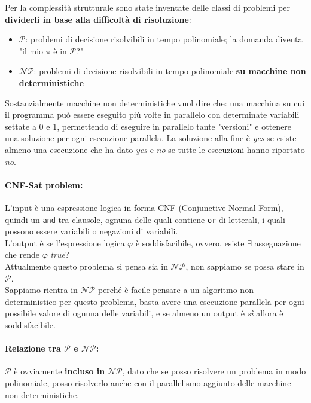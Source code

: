 Per la complessità strutturale sono state inventate delle classi di problemi per \textbf{dividerli in base alla difficoltà di risoluzione}: 
\begin{itemize}
	\item $\mathcal{P}$: problemi di decisione risolvibili in tempo polinomiale; la domanda diventa "il mio $\pi$ è in $\mathcal{P}$?"
	\item $\mathcal{NP}$: problemi di decisione risolvibili in tempo polinomiale \textbf{su macchine non deterministiche} 
\end{itemize}

Sostanzialmente macchine non deterministiche vuol dire che: una macchina su cui il programma può essere eseguito più volte in parallelo con determinate variabili settate a 0 e 1, permettendo di eseguire in parallelo tante "versioni" e ottenere una soluzione per ogni esecuzione parallela. La soluzione alla fine è \textit{yes} se esiste almeno una esecuzione che ha dato \textit{yes} e \textit{no} se tutte le esecuzioni hanno riportato \textit{no}. \\

\paragraph{CNF-Sat problem:} L'input è una espressione logica in forma CNF (Conjunctive Normal Form), quindi un \texttt{and} tra clausole, ognuna delle quali contiene \texttt{or} di letterali, i quali possono essere variabili o negazioni di variabili.\\

L'output è se l'espressione logica $\varphi$ è soddisfacibile, ovvero, esiste $\exists$ assegnazione che rende $\varphi$ \textit{true}? \\
Attualmente questo problema si pensa sia in $\mathcal{NP}$, non sappiamo se possa stare in $\mathcal{P}$.\\

Sappiamo rientra in $\mathcal{NP}$ perché è facile pensare a un algoritmo non deterministico per questo problema, basta avere una esecuzione parallela per ogni possibile valore di ognuna delle variabili, e se almeno un output è \textit{sì} allora è soddisfacibile.\\

\newpage

\paragraph{Relazione tra $\mathcal{P}$ e $\mathcal{NP}$:} $\mathcal{P}$ è ovviamente \textbf{incluso in} $\mathcal{NP}$, dato che se posso risolvere un problema in modo polinomiale, posso risolverlo anche con il parallelismo aggiunto delle macchine non deterministiche.\\

